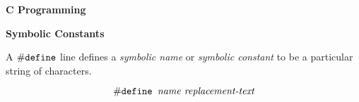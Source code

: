 {\bf C Programming}

\vskip 1cm
{\bf Symbolic Constants}

\vskip 1mm
A $\#\hbox{{\tt define}}$ line defines a {\it symbolic name} or {\it symbolic constant} to be a particular string of characters.

$$\#\hbox{{\tt define }\hbox{{\it name replacement-text}}}$$

\filbreak


\vfill\eject
\bye
